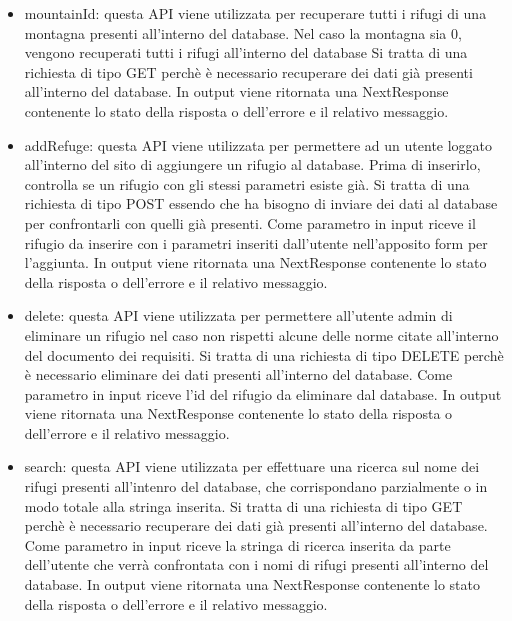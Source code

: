 \documentclass[a4paper,12pt]{article}
\begin{document}
\begin{itemize}
    \item mountainId: \newline
    questa API viene utilizzata per recuperare tutti i rifugi di una montagna presenti all'interno del database. Nel caso la montagna sia 0, vengono recuperati tutti i rifugi all'interno del database \newline
    Si tratta di una richiesta di tipo GET perchè è necessario recuperare dei dati già presenti all'interno del database. \newline
    In output viene ritornata una NextResponse contenente lo stato della risposta o dell'errore e il relativo messaggio. \newline
    \item addRefuge: \newline
    questa API viene utilizzata per permettere ad un utente loggato all'interno del sito di aggiungere un rifugio al database. Prima di inserirlo, controlla se un rifugio con gli stessi parametri esiste già. \newline
    Si tratta di una richiesta di tipo POST essendo che ha bisogno di inviare dei dati al database per confrontarli con quelli già presenti.\newline
    Come parametro in input riceve il rifugio da inserire con i parametri inseriti dall'utente nell'apposito form per l'aggiunta.\newline
    In output viene ritornata una NextResponse contenente lo stato della risposta o dell'errore e il relativo messaggio.
     \item delete: \newline
    questa API viene utilizzata per permettere all'utente admin di eliminare un rifugio nel caso non rispetti alcune delle norme citate all'interno del documento dei requisiti. \newline
    Si tratta di una richiesta di tipo DELETE perchè è necessario eliminare dei dati presenti all'interno del database. \newline
    Come parametro in input riceve l'id del rifugio da eliminare dal database.\newline
    In output viene ritornata una NextResponse contenente lo stato della risposta o dell'errore e il relativo messaggio.
    \item search: \newline
    questa API viene utilizzata per effettuare una ricerca sul nome dei rifugi presenti all'intenro del database, che corrispondano parzialmente o in modo totale alla stringa inserita. \newline
    Si tratta di una richiesta di tipo GET perchè è necessario recuperare dei dati già presenti all'interno del database. \newline
    Come parametro in input riceve la stringa di ricerca inserita da parte dell'utente che verrà confrontata con i nomi di rifugi presenti all'interno del database.\newline
    In output viene ritornata una NextResponse contenente lo stato della risposta o dell'errore e il relativo messaggio.
\end{itemize}
\end{document}
